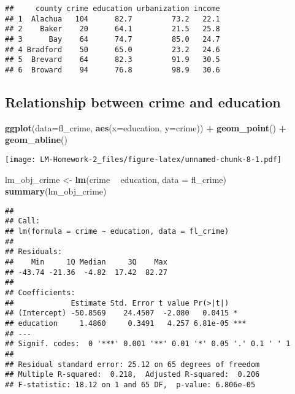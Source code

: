 \documentclass[
]{article}
\newenvironment{Shaded}{\begin{snugshade}}{\end{snugshade}}
\newcommand{\DataTypeTok}[1]{\textcolor[rgb]{0.13,0.29,0.53}{#1}}
\newcommand{\KeywordTok}[1]{\textcolor[rgb]{0.13,0.29,0.53}{\textbf{#1}}}
\newcommand{\NormalTok}[1]{#1}
\newcommand{\OperatorTok}[1]{\textcolor[rgb]{0.81,0.36,0.00}{\textbf{#1}}}
\newcommand{\StringTok}[1]{\textcolor[rgb]{0.31,0.60,0.02}{#1}}
\begin{document}
\begin{verbatim}
##     county crime education urbanization income
## 1  Alachua   104      82.7         73.2   22.1
## 2    Baker    20      64.1         21.5   25.8
## 3      Bay    64      74.7         85.0   24.7
## 4 Bradford    50      65.0         23.2   24.6
## 5  Brevard    64      82.3         91.9   30.5
## 6  Broward    94      76.8         98.9   30.6
\end{verbatim}

\hypertarget{relationship-between-crime-and-education}{%
\subsection{Relationship between crime and
education}\label{relationship-between-crime-and-education}}

\begin{Shaded}
\begin{Highlighting}[]
\KeywordTok{ggplot}\NormalTok{(}\DataTypeTok{data=}\NormalTok{fl_crime,}
       \KeywordTok{aes}\NormalTok{(}\DataTypeTok{x=}\NormalTok{education, }\DataTypeTok{y=}\NormalTok{crime)) }\OperatorTok{+}\StringTok{ }\KeywordTok{geom_point}\NormalTok{() }\OperatorTok{+}\StringTok{ }\KeywordTok{geom_abline}\NormalTok{()}
\end{Highlighting}
\end{Shaded}

\texttt{[image: LM-Homework-2\_files/figure-latex/unnamed-chunk-8-1.pdf]}

\begin{Shaded}
\begin{Highlighting}[]
\NormalTok{lm_obj_crime <-}\StringTok{ }\KeywordTok{lm}\NormalTok{(crime }\OperatorTok{~}\StringTok{ }\NormalTok{education, }\DataTypeTok{data =}\NormalTok{ fl_crime)}
\KeywordTok{summary}\NormalTok{(lm_obj_crime)}
\end{Highlighting}
\end{Shaded}

\begin{verbatim}
## 
## Call:
## lm(formula = crime ~ education, data = fl_crime)
## 
## Residuals:
##    Min     1Q Median     3Q    Max 
## -43.74 -21.36  -4.82  17.42  82.27 
## 
## Coefficients:
##             Estimate Std. Error t value Pr(>|t|)    
## (Intercept) -50.8569    24.4507  -2.080   0.0415 *  
## education     1.4860     0.3491   4.257 6.81e-05 ***
## ---
## Signif. codes:  0 '***' 0.001 '**' 0.01 '*' 0.05 '.' 0.1 ' ' 1
## 
## Residual standard error: 25.12 on 65 degrees of freedom
## Multiple R-squared:  0.218,  Adjusted R-squared:  0.206 
## F-statistic: 18.12 on 1 and 65 DF,  p-value: 6.806e-05
\end{verbatim}
\end{document}

